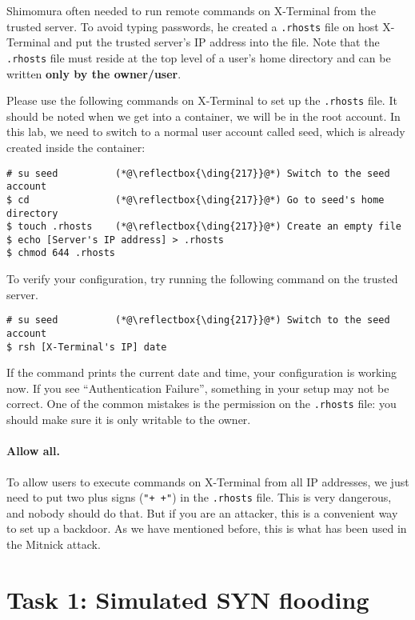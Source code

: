 Shimomura often needed to run remote commands on X-Terminal
from the trusted server. To avoid typing passwords, he
created a \texttt{.rhosts} file on host X-Terminal and put the trusted
server's IP address into the file.
Note that the \texttt{.rhosts} file must reside at the top level of a user's home directory and
can be written \textbf{only by the owner/user}.


Please use the following commands on X-Terminal to set up the \texttt{.rhosts} file.
It should be noted when we get into a container, we will be in the root 
account. In this lab, we need to switch to a normal user account called seed, which
is already created inside the container: 

\begin{lstlisting}
# su seed          (*@\reflectbox{\ding{217}}@*) Switch to the seed account
$ cd               (*@\reflectbox{\ding{217}}@*) Go to seed's home directory
$ touch .rhosts    (*@\reflectbox{\ding{217}}@*) Create an empty file 
$ echo [Server's IP address] > .rhosts
$ chmod 644 .rhosts
\end{lstlisting}

To verify your configuration, try running the following command on the trusted server.
\begin{lstlisting}
# su seed          (*@\reflectbox{\ding{217}}@*) Switch to the seed account
$ rsh [X-Terminal's IP] date
\end{lstlisting}

If the command prints the current date and time, your configuration is working now. If you
see ``Authentication Failure'', something in your setup may not be correct. 
One of the common mistakes is the permission on the \texttt{.rhosts} file:
you should make sure it is only writable to the owner.


\paragraph{Allow all.} To allow users to execute commands on X-Terminal from 
all IP addresses, we just need to put two plus signs (\texttt{"+ +"})
in the \texttt{.rhosts} file. This is very dangerous, and nobody should 
do that. But if you are an attacker, this is a convenient way
to set up a backdoor. As we have mentioned before, this is what has been used in
the Mitnick attack. 



\section{Task 1: Simulated SYN flooding}

